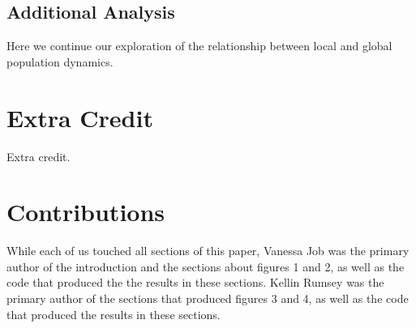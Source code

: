 \documentclass[conference]{IEEEtran}
\begin{document}
\subsection{Additional Analysis}
Here we continue our exploration of the relationship between local and global population dynamics.


\section{Extra Credit}  Extra credit.  






\section{Contributions}

While each of us touched all sections of this paper, Vanessa Job was the primary author of the introduction and the sections about figures 1 and 2, as well as the code that produced the the results in these sections.   Kellin Rumsey was the primary author of the sections that produced figures 3 and 4, as well as the code that produced the results in these sections.  



\end{document}
